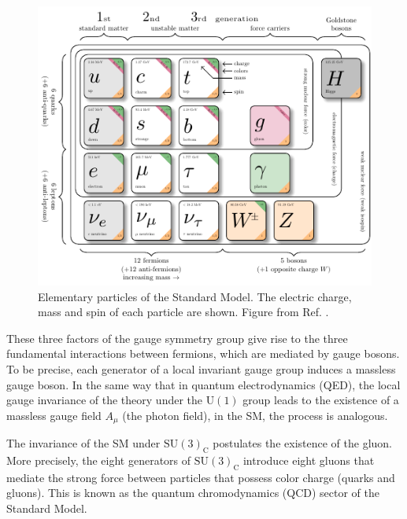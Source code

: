 \begin{figure}[!ht]
    \vspace*{-0.0cm}
    \centering
    \setlength{\mylength}{\textwidth}
    \includegraphics[width=0.84\mylength]{resources/SM_particles/SM_particles.pdf}
    \vspace*{-0.0cm}
    \caption{Elementary particles of the Standard Model. The electric charge, mass and spin of each particle are shown. Figure from Ref. \cite{Wongel:2816526}.}
    \label{fig:SM}
    \vspace*{-0.3cm}
\end{figure}
These three factors of the gauge symmetry group give rise to the three fundamental interactions between fermions, which are mediated by gauge bosons. To be precise, each generator of a local invariant gauge group induces a massless gauge boson. In the same way that in quantum electrodynamics (QED), the local gauge invariance of the theory under the $\text{U}(1)$ group leads to the existence of a massless gauge field $A_\mu$ (the photon field), in the SM, the process is analogous.

The invariance of the SM under $\text{SU}(3)_{\text{C}}$ postulates the existence of the gluon. More precisely, the eight generators of $\text{SU}(3)_{\text{C}}$ introduce eight gluons that mediate the strong force between particles that possess color charge (quarks and gluons). This is known as the quantum chromodynamics (QCD) sector of the Standard Model.

